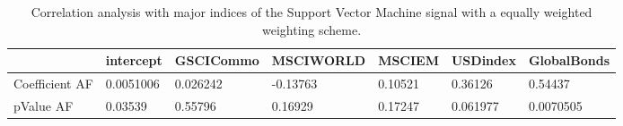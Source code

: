 \begin{table}[H]
\centering
\begin{tabular}{lllllll}
& intercept & GSCICommo & MSCIWORLD & MSCIEM & USDindex & GlobalBonds \\ 
\hline 
Coefficient AF & 0.0051006 & 0.026242 & -0.13763 & 0.10521 & 0.36126 & 0.54437 \\ 
pValue AF & 0.03539 & 0.55796 & 0.16929 & 0.17247 & 0.061977 & 0.0070505 \\ 
\hline
\end{tabular}
\caption{Correlation analysis with major indices of the Support Vector Machine signal with a equally weighted weighting scheme.}
\label{SVM_MODEL_EW_AFACTOR}
\end{table}